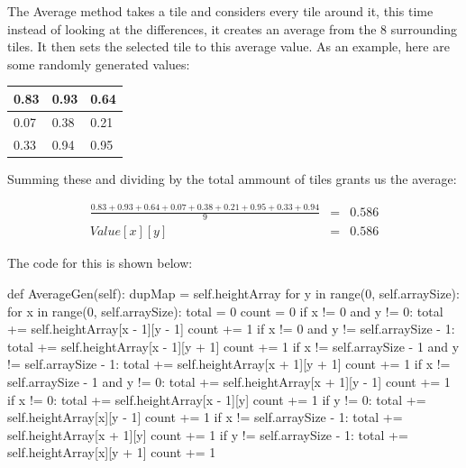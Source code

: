 \begin{flushleft}
            The Average method takes a tile and considers every tile around it, this time instead of looking at the
            differences, it creates an average from the 8 surrounding tiles. It then sets the selected tile to this
            average value. As an example, here are some randomly generated values:

            \begin{center}
                \begin{tabular}{| C{0.75cm} | C{0.75cm} | C{0.75cm} |}
                     & 0.93 & 0.64 \\ [0.75cm]
                     & 0.38 & 0.21 \\ [0.75cm]
                     & 0.94 & 0.95 \\ [0.75cm]
                    \hline
                \end{tabular}
                \vspace{0.25cm}

                Summing these and dividing by the total ammount of tiles grants us the average:

                \begin{eqnarray*}
                    \frac{0.83 + 0.93 + 0.64 + 0.07 + 0.38 + 0.21 + 0.95 + 0.33 + 0.94}{9} &=& 0.586 \\
                    Value[x][y] &=& 0.586
                \end{eqnarray*}
            \end{center}
            \vspace{0.25cm}

            The code for this is shown below:
            \begin{pythoncode}
def AverageGen(self):
    dupMap = self.heightArray
    for y in range(0, self.arraySize):
        for x in range(0, self.arraySize):        
            total = 0
            count = 0
            if x != 0 and y != 0:
                total += self.heightArray[x - 1][y - 1]
                count += 1
            if x != 0 and y != self.arraySize - 1:
                total += self.heightArray[x - 1][y + 1]
                count += 1
            if x != self.arraySize - 1 and y != self.arraySize - 1:
                total += self.heightArray[x + 1][y + 1]
                count += 1
            if x != self.arraySize - 1 and y != 0:
                total += self.heightArray[x + 1][y - 1]
                count += 1
            if x != 0:
                total += self.heightArray[x - 1][y]
                count += 1
            if y != 0:
                total += self.heightArray[x][y - 1]
                count += 1
            if x != self.arraySize - 1:
                total += self.heightArray[x + 1][y]
                count += 1
            if y != self.arraySize - 1:
                total += self.heightArray[x][y + 1]
                count += 1


\end{pythoncode}
\end{flushleft}
